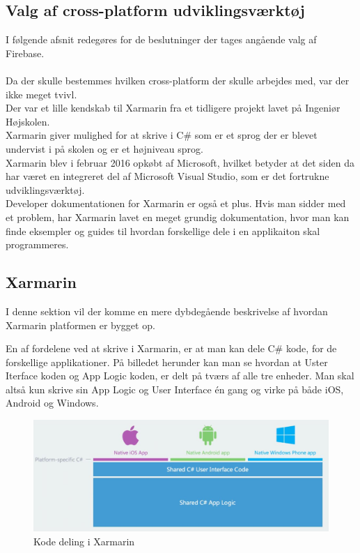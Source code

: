 \subsection{Valg af cross-platform udviklingsværktøj}
I følgende afsnit redegøres for de beslutninger der tages angående valg af Firebase. \\ \\
Da der skulle bestemmes hvilken cross-platform der skulle arbejdes med, var der ikke meget tvivl. \\
Der var et lille kendskab til Xarmarin fra et tidligere projekt lavet på Ingeniør Højskolen. \\
Xarmarin giver mulighed for at skrive i C\# som er et sprog der er blevet undervist i på skolen og er et højniveau sprog. \\
Xarmarin blev i februar 2016 opkøbt af Microsoft, hvilket betyder at det siden da har været en integreret del af Microsoft Visual Studio, som er det fortrukne udviklingsværktøj.\\
Developer dokumentationen for Xarmarin er også et plus. Hvis man sidder med et problem, har Xarmarin lavet en meget grundig dokumentation, hvor man kan finde eksempler og guides til hvordan forskellige dele i en applikaiton skal programmeres.

\subsection{Xarmarin}
I denne sektion vil der komme en mere dybdegående beskrivelse af hvordan Xarmarin platformen er bygget op.

En af fordelene ved at skrive i Xarmarin, er at man kan dele C\# kode, for de forskellige applikationer.
På billedet herunder kan man se hvordan at Uster Iterface koden og App Logic koden, er delt på tværs af alle tre enheder. Man skal altså kun skrive sin App Logic og User Interface én gang og virke på både iOS, Android og Windows.
\begin{figure}[H]
	\centering
	\includegraphics[width=1\linewidth]{Applikation/XarmarinShare.JPG}
	\caption{Kode deling i Xarmarin}
	\label{fig:CodeShare}
\end{figure}

